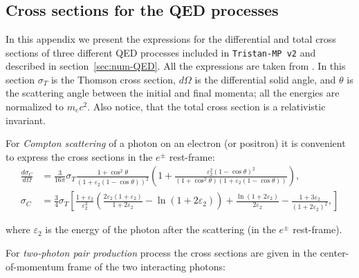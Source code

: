 \chapter{}
\section{Cross sections for the QED processes}
\label{appendix:num-crosssections}

In this appendix we present the expressions for the differential and total cross sections of three different QED processes included in \texttt{Tristan-MP v2} and described in section~\ref{sec:num-QED}. All the expressions are taken from \cite{1985quel.book.....A}. In this section $\sigma_T$ is the Thomson cross section, $d\Omega$ is the differential solid angle, and $\theta$ is the scattering angle between the initial and final momenta; all the energies are normalized to $m_e c^2$. Also notice, that the total cross section is a relativistic invariant.

For \emph{Compton scattering} of a photon on an electron (or positron) it is convenient to express the cross sections in the $e^\pm$ rest-frame:
\begin{equation}
    \begin{aligned}
        \frac{d \sigma_C}{d\Omega} &= \frac{3}{16\pi} \sigma_T 
            \frac{1 + \cos^2{\theta}}{\left(1 + \varepsilon_2(1-\cos{\theta})\right)^2}
            \left(1 + \frac{\varepsilon_2^2(1-\cos{\theta})^2}{(1+\cos^2{\theta})\left(1 + \varepsilon_2 (1-\cos{\theta})\right)}\right),\\
        \sigma_C &= \frac{3}{4}\sigma_T\left[
            \frac{1+\varepsilon_2}{\varepsilon_2^3}
                \left( \frac{2\varepsilon_2(1+\varepsilon_2)}{1+2\varepsilon_2} - \ln{(1 + 2\varepsilon_2)}\right)
            + \frac{\ln{(1+2\varepsilon_2)}}{2\varepsilon_2} - \frac{1 + 3\varepsilon_2}{(1 + 2\varepsilon_2)^2},
        \right]
    \end{aligned}
\end{equation}

\noindent where $\varepsilon_2$ is the energy of the photon after the scattering (in the  $e^\pm$ rest-frame).

For \emph{two-photon pair production} process the cross sections are given in the center-of-momentum frame of the two interacting photons:


